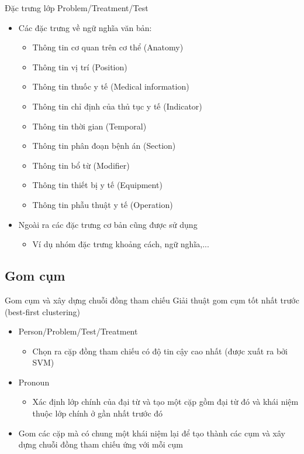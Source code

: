 \begin{frame}{Đặc trưng lớp Problem/Treatment/Test}
\putlogo
\begin{itemize}
	\item Các đặc trưng về ngữ nghĩa văn bản:
	\begin{itemize}
		\item Thông tin cơ quan trên cơ thể (Anatomy)
		\item Thông tin vị trí (Position)
		\item Thông tin thuốc y tế (Medical information)
		\item Thông tin chỉ định của thủ tục y tế (Indicator)
		\item Thông tin thời gian (Temporal)
		\item Thông tin phân đoạn bệnh án (Section)
		\item Thông tin bổ từ (Modifier)
		\item Thông tin thiết bị y tế (Equipment)
		\item Thông tin phẫu thuật y tế (Operation)
	\end{itemize}
	\item Ngoài ra các đặc trưng cơ bản cũng được sử dụng
	\begin{itemize}
		\item Ví dụ nhóm đặc trưng khoảng cách, ngữ nghĩa,...
	\end{itemize}
\end{itemize}
\end{frame}

\subsection{Gom cụm}
\begin{frame}{Gom cụm và xây dựng chuỗi đồng tham chiếu}
\putlogo
Giải thuật gom cụm tốt nhất trước (best-first clustering)
\begin{itemize}
	\item Person/Problem/Test/Treatment
	\begin{itemize}
		\item Chọn ra cặp đồng tham chiếu có độ tin cậy cao nhất (được xuất ra bởi SVM)
	\end{itemize} 
	\item Pronoun
	\begin{itemize}
		\item Xác định lớp chính của đại từ và tạo một cặp gồm đại từ đó và khái niệm thuộc lớp chính ở gần nhất trước đó
	\end{itemize}
	\item Gom các cặp mà có chung một khái niệm lại để tạo thành các cụm và xây dựng chuỗi đồng tham chiếu ứng với mỗi cụm
\end{itemize}
\end{frame}
